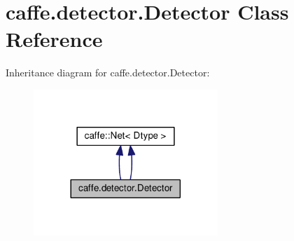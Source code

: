 \hypertarget{classcaffe_1_1detector_1_1_detector}{}\section{caffe.\+detector.\+Detector Class Reference}
\label{classcaffe_1_1detector_1_1_detector}


Inheritance diagram for caffe.\+detector.\+Detector\+:
\nopagebreak
\begin{figure}[H]
\begin{center}
\leavevmode
\includegraphics[width=197pt]{classcaffe_1_1detector_1_1_detector__inherit__graph}
\end{center}
\end{figure}
